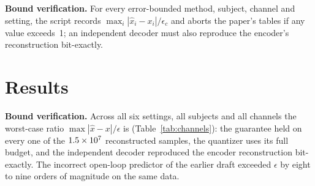 \documentclass[conference]{IEEEtran}
\begin{document}
\textbf{Bound verification.} For every error-bounded method, subject, channel and setting, the script records $\max_i|\hat{x}_i-x_i|/\epsilon_c$ and aborts the paper's tables if any value exceeds~1; an independent decoder must also reproduce the encoder's reconstruction bit-exactly.

\section{Results}
\begin{table}[t]
\caption{Compression ratio and LOSO stress-detection accuracy of the proposed pipeline (matched scenario; mean $\pm$ 95\% CI over \nSubjects{} subjects; $p$: Wilcoxon vs.\ uncompressed).}
\label{tab:main}
\centering\scriptsize
\resizebox{\columnwidth}{!}{}
\end{table}

\begin{table}[t]
\caption{Baselines. Top: error-bounded methods at each $\epsilon$ (rate-weighted ratio, accuracy change vs.\ uncompressed in points, and for ZFP the realized worst-case error). Bottom: methods without a tunable bound (ratio, matched $\Delta$Acc., accuracy of an uncompressed-trained model on the reconstructed test data).}
\label{tab:baselines}
\centering\scriptsize
\resizebox{\columnwidth}{!}{}
\end{table}

\begin{table}[t]
\caption{Per-channel ratio of the proposed pipeline and worst-case $\max|\hat{x}-x|/\epsilon$ over all subjects and samples.}
\label{tab:channels}
\centering\scriptsize
\resizebox{\columnwidth}{!}{}
\end{table}

\textbf{Bound verification.} Across all six settings, all \nSubjects{} subjects and all channels the worst-case ratio $\max|\hat{x}-x|/\epsilon$ is \maxErrRatioAll{} (Table~\ref{tab:channels}): the guarantee held on every one of the $1.5\times10^{7}$ reconstructed samples, the quantizer uses its full budget, and the independent decoder reproduced the encoder reconstruction bit-exactly. The incorrect open-loop predictor of the earlier draft exceeded $\epsilon$ by eight to nine orders of magnitude on the same data.
\end{document}
